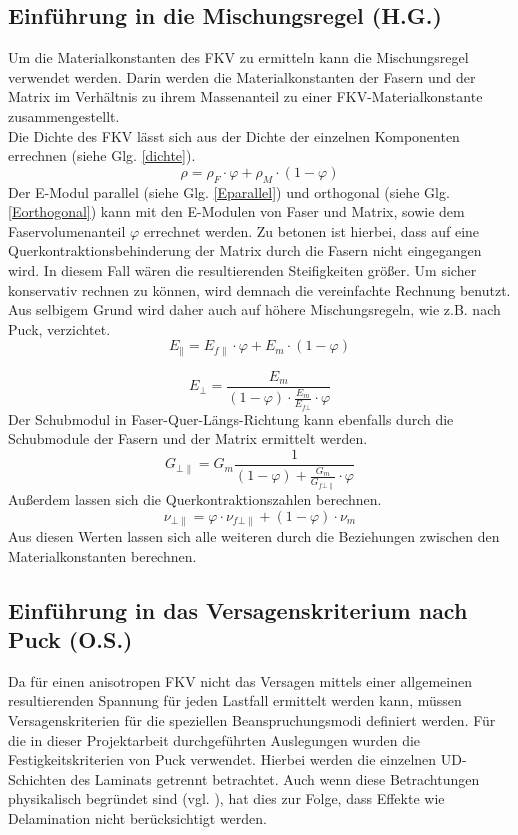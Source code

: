 \subsection{Einführung in die Mischungsregel (H.G.)}
Um die Materialkonstanten des FKV zu ermitteln kann die Mischungsregel verwendet werden. Darin werden die Materialkonstanten der Fasern und der Matrix im Verhältnis zu ihrem Massenanteil zu einer FKV-Materialkonstante zusammengestellt.\\
\noindent
Die Dichte des FKV lässt sich aus der Dichte der einzelnen Komponenten errechnen (siehe Glg. \ref{dichte}).
\begin{equation}
\label{dichte}
	\rho=\rho_{F}\cdot\varphi +\rho_{M}\cdot (1-\varphi)
\end{equation}
\noindent
Der E-Modul parallel (siehe Glg. \ref{Eparallel}) und orthogonal (siehe Glg. \ref{Eorthogonal}) kann mit den E-Modulen von Faser und Matrix, sowie dem Faservolumenanteil $\varphi$ errechnet werden. Zu betonen ist hierbei, dass auf eine Querkontraktionsbehinderung der Matrix durch die Fasern nicht eingegangen wird. In diesem Fall wären die resultierenden Steifigkeiten größer. Um sicher konservativ rechnen zu können, wird demnach die vereinfachte Rechnung benutzt. Aus selbigem Grund wird daher auch auf höhere Mischungsregeln, wie z.B. nach Puck, verzichtet. 
\begin{equation}
\label{Eparallel}
E_{\|}=E_{f\|}\cdot \varphi+E_{m}\cdot (1-\varphi)
\end{equation}

\begin{equation}
\label{Eorthogonal}
E_{\bot}=\frac{E_{m}}{(1-\varphi)\cdot\frac{E_{m}}{E_{f\bot}}\cdot\varphi}
\end{equation}
\noindent
Der Schubmodul in Faser-Quer-Längs-Richtung kann ebenfalls durch die Schubmodule der Fasern und der Matrix ermittelt werden.
\begin{equation}
G_{\bot\|}=G_{m}\frac{1}{(1-\varphi)+\frac{G_{m}}{G_{f\bot\|}}\cdot\varphi}
\end{equation}
Außerdem lassen sich die Querkontraktionszahlen berechnen.
\begin{equation}
\nu_{\bot\|}=\varphi\cdot \nu_{f\bot\|}+(1-\varphi)\cdot \nu_{m}
\end{equation}
Aus diesen Werten lassen sich alle weiteren durch die Beziehungen zwischen den Materialkonstanten berechnen.\cite{item3}
\newpage
\subsection{Einführung in das Versagenskriterium nach Puck (O.S.)}
Da für einen anisotropen FKV nicht das Versagen mittels einer allgemeinen resultierenden Spannung für jeden Lastfall ermittelt werden kann, müssen Versagenskriterien für die speziellen Beanspruchungsmodi definiert werden. Für die in dieser Projektarbeit durchgeführten Auslegungen wurden die Festigkeitskriterien von Puck verwendet. Hierbei werden die einzelnen UD-Schichten des Laminats getrennt betrachtet. Auch wenn diese Betrachtungen physikalisch begründet sind (vgl. \cite{EdL}), hat dies zur Folge, dass Effekte wie Delamination nicht berücksichtigt werden.
